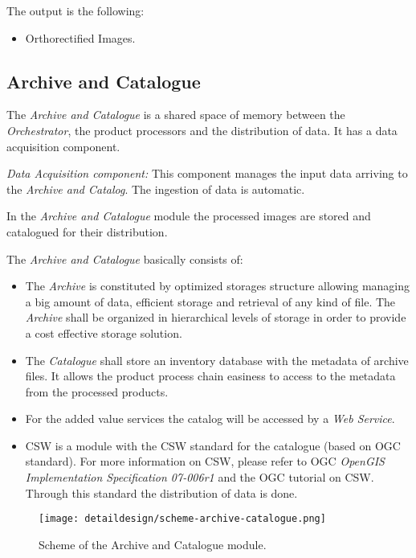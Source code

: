 The output is the following:
\begin{itemize}
\item Orthorectified Images.
\end{itemize}




\subsection{Archive and Catalogue}
\label{sub:archive}

The \emph{Archive and Catalogue} is a shared space of memory between the \emph{Orchestrator}, the product processors and the distribution of data. It has a data acquisition component.

\emph{Data Acquisition component:} This component manages the input data arriving to the \emph{Archive and Catalog}. The ingestion of data is automatic.

In the \emph{Archive and Catalogue} module the processed images are stored and catalogued for their distribution.

The \emph{Archive and Catalogue} basically consists of:
\begin{itemize}
\item The \emph{Archive} is constituted by optimized storages structure allowing managing a big amount of data, efficient storage and retrieval of any kind of file. The \emph{Archive} shall be organized in hierarchical levels of storage in order to provide a cost effective storage solution.

\item The \emph{Catalogue} shall store an inventory database with the metadata of archive files. It allows the product process chain easiness to access to the metadata from the processed products.

\item For the added value services the catalog will be accessed by a \emph{Web Service}.

\item \ac{CSW} is a module with the \ac{CSW} standard for the catalogue (based on \ac{OGC} standard). For more information on \ac{CSW}, please refer to \ac{OGC} \emph{OpenGIS Implementation Specification 07-006r1} and the \ac{OGC} tutorial on \ac{CSW}. Through this standard the distribution of data is done.
\end{itemize}

\begin{figure}[!h]
\begin{center}
\texttt{[image: detaildesign/scheme-archive-catalogue.png]}
\caption{Scheme of the Archive and Catalogue module.}
\label{fig:archive-catalogue-scheme}
\end{center}
\end{figure}




